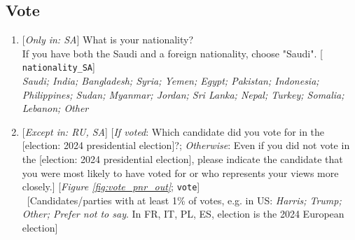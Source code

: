  \subsection*{Vote} 
 \begin{enumerate}[resume] 
\item  \label{q:nationality_SA} [\textit{Only in: SA}] What is your nationality?\\If you have both the Saudi and a foreign nationality, choose "Saudi". [%
\verb|nationality_SA|]
  \\ \textit{Saudi; India; Bangladesh; Syria; Yemen; Egypt; Pakistan; Indonesia; Philippines; Sudan; Myanmar; Jordan; Sri Lanka; Nepal; Turkey; Somalia; Lebanon; Other}

\item  \label{q:vote} [\textit{Except in: RU, SA}] [\textit{If voted}: Which candidate did you vote for in the [election: 2024 presidential election]?; \textit{Otherwise}: Even if you did not vote in the [election: 2024 presidential election], please indicate the candidate that you were most likely to have voted for or who represents your views more closely.] [\textit{Figure%
\ref{fig:vote_pnr_out}}; 
\verb|vote|]
  \\ ~[Candidates/parties with at least 1\% of votes, e.g. in US: \textit{Harris; Trump; Other; Prefer not to say}. In FR, IT, PL, ES, election is the 2024 European election]




\end{enumerate}
